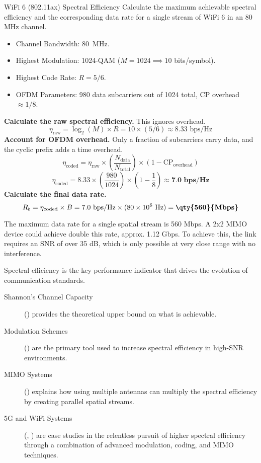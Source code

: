 \begin{workedexample}{WiFi 6 (802.11ax) Spectral Efficiency}
     Calculate the maximum achievable spectral efficiency and the corresponding data rate for a single stream of WiFi 6 in an 80 MHz channel.
    \begin{itemize}
        \item Channel Bandwidth: \qty{80}{MHz}.
        \item Highest Modulation: 1024-QAM ($M=1024 \implies 10$ bits/symbol).
        \item Highest Code Rate: $R=5/6$.
        \item OFDM Parameters: 980 data subcarriers out of 1024 total, CP overhead $\approx 1/8$.
    \end{itemize}
    \begin{derivationsteps}
        \step \textbf{Calculate the raw spectral efficiency.} This ignores overhead.
        \[ \eta_{\text{raw}} = \log_2(M) \times R = 10 \times (5/6) \approx 8.33 \text{ bps/Hz} \]
        \step \textbf{Account for OFDM overhead.} Only a fraction of subcarriers carry data, and the cyclic prefix adds a time overhead.
        \[ \eta_{\text{coded}} = \eta_{\text{raw}} \times \left(\frac{N_{\text{data}}}{N_{\text{total}}}\right) \times \left(1 - \text{CP}_{\text{overhead}}\right) \]
        \[ \eta_{\text{coded}} = 8.33 \times \left(\frac{980}{1024}\right) \times \left(1 - \frac{1}{8}\right) \approx \textbf{7.0 bps/Hz} \]
        \step \textbf{Calculate the final data rate.}
        \[ R_b = \eta_{\text{coded}} \times B = 7.0 \text{ bps/Hz} \times (80 \times 10^6 \text{ Hz}) = \textbf{\qty{560}{Mbps}} \]
    \end{derivationsteps}
     The maximum data rate for a single spatial stream is 560 Mbps. A 2x2 MIMO device could achieve double this rate, approx. 1.12 Gbps. To achieve this, the link requires an SNR of over 35 dB, which is only possible at very close range with no interference.
\end{workedexample}

\begin{importantbox}[title={Further Reading}]
    Spectral efficiency is the key performance indicator that drives the evolution of communication standards.
    \begin{description}
        \item[Shannon's Channel Capacity] () provides the theoretical upper bound on what is achievable.
        \item[Modulation Schemes] () are the primary tool used to increase spectral efficiency in high-SNR environments.
        \item[MIMO Systems] () explains how using multiple antennas can multiply the spectral efficiency by creating parallel spatial streams.
        \item[5G and WiFi Systems] (, ) are case studies in the relentless pursuit of higher spectral efficiency through a combination of advanced modulation, coding, and MIMO techniques.
    \end{description}
\end{importantbox}